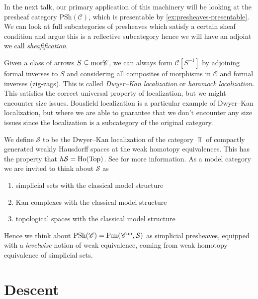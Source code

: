 \documentclass[11pt]{amsart}
\renewcommand{\Pre}{\mathrm{PSh}}
\begin{document}
\begin{example} In the next talk, our primary application of this machinery will be looking at the presheaf category $\Pre(\mathscr{C})$, which is presentable by \autoref{ex:presheaves-presentable}. We can look at full subcategories of presheaves which satisfy a certain sheaf condition and argue this is a reflective subcategory hence we will have an adjoint we call \textit{sheafification}.
\end{example}

\begin{remark} Given a class of arrows $S \subseteq \mathrm{mor} \mathscr{C}$, we can always form $\mathscr{C}[S^{-1}]$ by adjoining formal inverses to $S$ and considering all composites of morphisms in $\mathscr{C}$ and formal inverses (zig-zags). This is called \textit{Dwyer--Kan localization} or \textit{hammock localization}. This satisfies the correct universal property of localization, but we might encounter size issues. Bousfield localization is a particular example of Dwyer--Kan localization, but where we are able to guarantee that we don't encounter any size issues since the localization is a subcategory of the original category.
\end{remark}


\begin{example} We define $\mathcal{S}$ to be the Dwyer--Kan localization of the category $\Top$ of compactly generated weakly Hausdorff spaces at the weak homotopy equivalences. This has the property that $h \mathcal{S} = \mathrm{Ho}(\mathrm{Top})$. See \cite[\S1.2.16]{HTT} for more information. As a model category we are invited to think about $\mathcal{S}$ as
\begin{enumerate}
    \item simplicial sets with the classical model structure
    \item Kan complexes with the classical model structure
    \item topological spaces with the classical model structure
\end{enumerate}
Hence we think about $\Pre(\mathscr{C}) = \Fun(\mathscr{C}^\op, \mathcal{S})$ as simplicial presheaves, equipped with a \textit{levelwise} notion of weak equivalence, coming from weak homotopy equivalence of simplicial sets.
\end{example}



\section{\sectionheader Descent}
\end{document}
